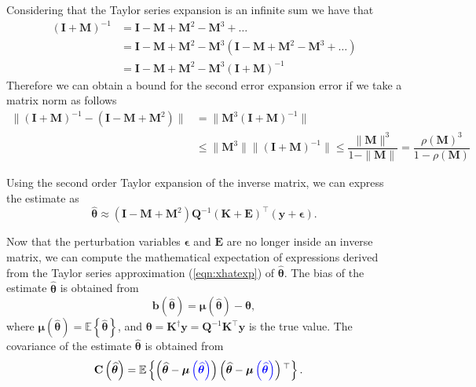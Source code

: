 Considering that the Taylor series expansion is an infinite sum we have that
\begin{equation} \begin{aligned} (\mathbf{I} + \mathbf{M})^{-1} &= \mathbf{I} - \mathbf{M} + \mathbf{M}^2 - \mathbf{M}^3 + \ldots \\
&=  \mathbf{I} - \mathbf{M} + \mathbf{M}^2 - \mathbf{M}^3 \left( \mathbf{I} - \mathbf{M} + \mathbf{M}^2 - \mathbf{M}^3 + \ldots \right) \\
&=  \mathbf{I} - \mathbf{M} + \mathbf{M}^2 - \mathbf{M}^3  (\mathbf{I} + \mathbf{M})^{-1} \end{aligned} \end{equation} 
Therefore we can obtain a bound for the second error expansion error if we take a matrix norm as follows
\begin{equation} \begin{aligned} \| (\mathbf{I} + \mathbf{M})^{-1} - ( \mathbf{I} - \mathbf{M} + \mathbf{M}^2 ) \| &=  \| \mathbf{M}^3  (\mathbf{I} + \mathbf{M})^{-1} \| \\
& \leq \| \mathbf{M}^3 \| \| (\mathbf{I} + \mathbf{M})^{-1} \| \leq \dfrac{\| \mathbf{M} \|^3}{ 1 -  \| \mathbf{M} \|} = \dfrac{\rho(\mathbf{M})^3}{1 - \rho(\mathbf{M})}  \end{aligned} \end{equation} 

Using the second order Taylor expansion of the inverse matrix\color{black}, we can express the estimate as
\begin{equation} \widehat{\bm{\theta}} \approx \left( \mathbf{I} - \mathbf{M} + \mathbf{M}^2 \right) \mathbf{Q}^{-1} (\mathbf{K}+\mathbf{E})^\top (\mathbf{y}+\bm{\epsilon}). \label{eqn:xhatexp} \end{equation} 

Now that the perturbation variables $\bm{\epsilon}$ and $\mathbf{E}$ are no longer inside an inverse matrix, we can compute the mathematical expectation of expressions derived from the Taylor series approximation (\ref{eqn:xhatexp}) of $\widehat{\bm{\theta}}$. 
The bias of the estimate $\widehat{\bm{\theta}}$ is obtained from
\begin{equation} \mathbf{b} \left(\widehat{\bm{\theta}} \right) = \bm{\mu}\left(\widehat{\bm{\theta}} \right) - \bm{\theta}, \label{eqn:biasdef} \end{equation}
where $\bm{\mu} \left(\widehat{\bm{\theta}} \right) = \mathbb{E} \left\{ \widehat{\bm{\theta}} \right\}$, and $\bm{\theta} = \mathbf{K}^\dagger \mathbf{y} = \mathbf{Q}^{-1} \mathbf{K}^\top \mathbf{y}$ is the true value.
The covariance of the estimate $\widehat{\bm{\theta}}$ is obtained from
\begin{equation} \begin{aligned} \mathbf{C} \left( \widehat{\bm{\theta}} \right) & = \mathbb{E} \left\{ \left( \widehat{\bm{\theta}} - \bm{\mu} \color{blue} \left(\widehat{\bm{\theta}} \right) \color{black} \right) \left( \widehat{\bm{\theta}} - \bm{\mu} \color{blue} \left(\widehat{\bm{\theta}} \right) \color{black} \right)^\top \right\} . \end{aligned} \label{eqn:covdef} \end{equation} 


